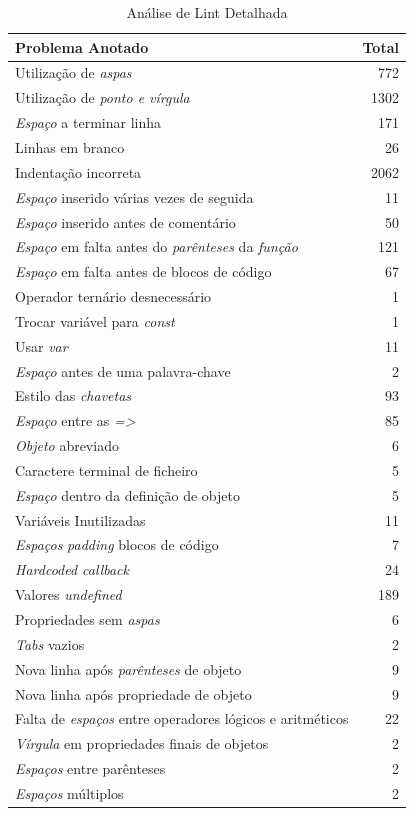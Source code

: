\documentclass[a4paper,12pt]{article} %
\begin{document}
\vspace{1cm}
\begin{table}[H]
	\centering
	\begin{tabular}{|l|r|}
		\hline
		\textbf{Problema Anotado} & \textbf{Total} \\
		\hline
		Utilização de \textit{aspas} & 772 \\
		\hline
		Utilização de \textit{ponto e vírgula} & 1302 \\
		\hline
		\textit{Espaço} a terminar linha & 171 \\
		\hline
		Linhas em branco & 26 \\
		\hline
		Indentação incorreta & 2062 \\
		\hline
		\textit{Espaço} inserido várias vezes de seguida & 11 \\
		\hline
		\textit{Espaço} inserido antes de comentário & 50 \\
		\hline
		\textit{Espaço} em falta antes do \textit{parênteses} da \textit{função} & 121 \\
		\hline
		\textit{Espaço} em falta antes de blocos de código & 67 \\
		\hline
		Operador ternário desnecessário & 1 \\
		\hline
		Trocar variável para \textit{const} & 1 \\
		\hline
		Usar \textit{var} & 11 \\
		\hline
		\textit{Espaço} antes de uma palavra-chave & 2 \\
		\hline
		Estilo das \textit{chavetas} & 93 \\
		\hline
		\textit{Espaço} entre as \textit{=>} & 85 \\
		\hline
		\textit{Objeto} abreviado & 6 \\
		\hline
		Caractere terminal de ficheiro & 5 \\
		\hline
		\textit{Espaço} dentro da definição de objeto & 5 \\
		\hline
		Variáveis Inutilizadas & 11 \\
		\hline
		\textit{Espaços} \textit{padding} blocos de código & 7 \\
		\hline
		\textit{Hardcoded callback} & 24 \\
		\hline
		Valores \textit{undefined} & 189 \\
		\hline
		Propriedades sem \textit{aspas} & 6 \\
		\hline
		\textit{Tabs} vazios & 2 \\
		\hline
		Nova linha após \textit{parênteses} de objeto & 9 \\
		\hline
		Nova linha após propriedade de objeto & 9 \\
		\hline
		Falta de \textit{espaços} entre operadores lógicos e aritméticos & 22 \\
		\hline
		\textit{Vírgula} em propriedades finais de objetos & 2 \\
		\hline
		\textit{Espaços} entre parênteses & 2 \\
		\hline
		\textit{Espaços} múltiplos & 2 \\
		\hline
	\end{tabular}
	\caption{Análise de Lint Detalhada}
\end{table}
\end{document}
